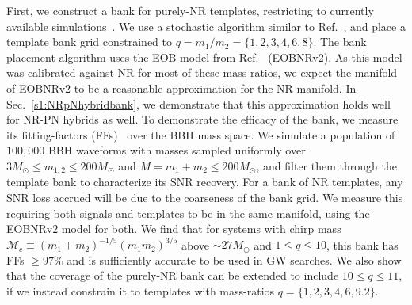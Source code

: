 \documentclass[aps,
prd,
twocolumn,
superscriptaddress,
lengthcheck,showpacs,letterpaper,nofootinbib,
floatfix]{revtex4-1}
\begin{document}
First, we construct a bank for purely-NR templates, restricting to
currently available simulations~\cite{MacDonald:2012mp,Mroue:2012kv,
Buchman:2012dw,Mroue:2013xna,Mroue:2012kv}. We use a stochastic algorithm 
similar to Ref.~\cite{Harry:2009ea,Ajith:2012mn,Manca:2009xw}, 
and place a template bank grid
constrained to $q=m_1/m_2=\{1,2,3,4,6,8\}$. The bank placement 
algorithm uses the EOB model from Ref.~\cite{BuonannoEOBv2Main} (EOBNRv2).
As this model was calibrated against NR for most of these mass-ratios, 
we expect the manifold of EOBNRv2 to be a reasonable approximation 
for the NR manifold. In Sec.~\ref{s1:NRpNhybridbank}, we demonstrate that
this approximation holds well for NR-PN hybrids as well.
To demonstrate the efficacy of the 
bank, we measure its fitting-factors (FFs)~\cite{FittingFactorApostolatos} over
the BBH mass space. We simulate a population of $100,000$ BBH waveforms with
masses sampled uniformly over 
$3M_\odot\leq m_{1,2}\leq 200M_\odot$ and $M=m_1+m_2\leq 200M_\odot$, and filter
them through the template bank to characterize its SNR recovery. For a
bank of NR templates, any SNR loss accrued will be due to the coarseness
of the bank grid. We measure this requiring both signals and templates
to be in the same manifold, using the EOBNRv2 model for both. We find 
that for systems with chirp mass 
$\mathcal{M}_c \equiv (m_1 + m_2)^{-1/5} (m_1 m_2)^{3/5}$ above 
$\sim 27M_{\odot}$ and $1\leq q\leq 10$, this bank has FFs $\geq 97\%$ and
is sufficiently accurate to be used in GW searches.
We also show that the coverage of the purely-NR bank can be extended to
include $10\leq q\leq 11$, if we instead constrain it to templates with
mass-ratios $q=\{1,2,3,4,6,9.2\}$.
\end{document}

